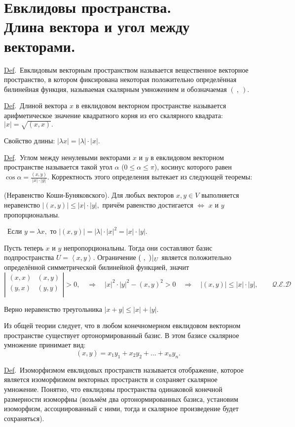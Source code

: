 \documentclass[draft]{article}%
\newcommand{\de}{\par\noindent\underline{Def}.\ }%
\newcommand{\ab}{\par\noindent}%
\newcommand{\dok}{\par\noindent{\textsl{Доказательство}.}\ }%
\newcommand{\lr}{\Leftrightarrow}%
\newcommand{\lob}[1]{\left\langle#1\right\rangle}%
\renewcommand{\le}{\leqslant}
\begin{document}
\section{Евклидовы пространства.\\ Длина вектора и угол между векторами.}
\label{q16} %
\de Евклидовым векторным пространством называется вещественное векторное пространство, в котором фиксирована
некоторая положительно определённая билинейная функция, называемая скалярным умножением и обозначаемая $(\ ,\
).$%
\de Длиной вектора $x$ в евклидовом векторном пространстве называется арифметическое значение квадратного корня из
его скалярного квадрата: $|x|=\sqrt{(x,x)}.$%
\ab Свойство длины: $|\lambda x|=|\lambda|\cdot|x|.$
%
\de Углом между ненулевыми векторами $x$ и $y$ в евклидовом векторном пространстве называется такой угол $\alpha$
($0\le\alpha\le\pi$), косинус которого равен $\cos\alpha=\frac{\displaystyle (x,y)}{\displaystyle |x|\cdot|y|}$.
Корректность этого определения вытекает из следующей теоремы:%
\ab{\bf Теорема} (Неравенство Коши-Буняковского). Для любых векторов $x,y\in V$ выполняется неравенство
$|(x,y)|\le|x|\cdot|y|,$ причём равенство достигается $\lr$ $x$ и $y$ пропорциональны.
\dok Если $y=\lambda x,$ то $|(x,y)|=|\lambda|\cdot|x|^2=|x|\cdot|y|.$%
\ab Пусть теперь $x$ и $y$ непропорциональны. Тогда они составляют базис подпространства $U=\lob{x,y}.$
Ограничение $(\ ,\ )\,\vrule\,_U$ является положительно определённой симметрической билинейной функцией, значит
$$
\left|%
\begin{array}{cc}
  (x,x) & (x,y) \\
  (y,x) & (y,y) \\
\end{array}%
\right|>0,\quad\Rightarrow\quad |x|^2\cdot|y|^2-(x,y)^2>0\quad\Rightarrow\quad
|(x,y)|\le|x|\cdot|y|,\qquad\mathcal{Q.E.D}
$$%
\ab Верно неравенство треугольника $|x+y|\le|x|+|y|.$%
\ab Из общей теории следует, что в любом конечномерном евклидовом векторном пространстве существует
ортонормированный базис. В этом базисе скалярное умножение принимает вид:
$$(x,y)=x_1y_1+x_2y_2+\dots+x_ny_n.$$
\de Изоморфизмом евклидовых пространств называется отображение, которое является изоморфизмом векторных
пространств и сохраняет скалярное умножение. Понятно, что евклидовы пространства одинаковой конечной размерности
изоморфны (возьмём два ортонормированных базиса, установим изоморфизм, ассоциированный с ними, тогда и
скалярное произведение будет сохраняться). %
\end{document}
